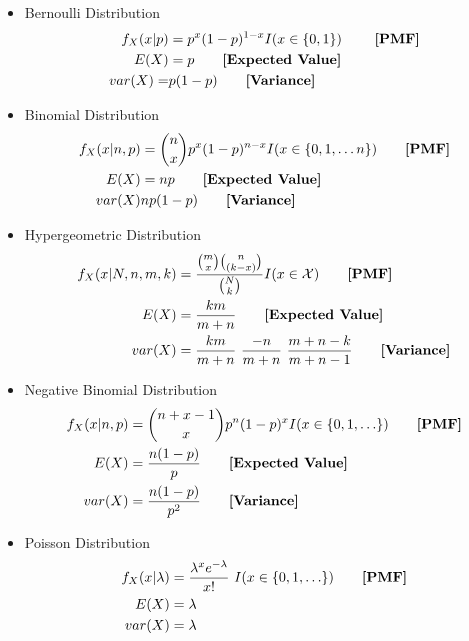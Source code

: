 \documentclass{article}
\begin{document}
  \begin{multicols}{2}
  \begin{itemize}
  \item Bernoulli Distribution
  \begin{align*}
  	f_X(x|p) &= p^x(1-p)^{1-x} I(x \in \{0,1\}) \tag*{ \textbf{[PMF]}}\\
  	E(X) &=p\tag*{\textbf{[Expected Value]}}\\
  	var(X)=&p(1-p)\tag*{\textbf{[Variance]}}\\
  \end{align*}
  \item Binomial Distribution
  \begin{align*}
  	f_X(x|n,p) &={n \choose x} p^x (1-p)^{n-x} I(x \in \{0,1,\ldots n\})\tag*{\textbf{[PMF]}}\\
  	E(X) &= np \tag*{\textbf{[Expected Value]}}\\
	  var(X) & np(1-p)\tag*{\textbf{[Variance]}}\\
  \end{align*}
  \item Hypergeometric Distribution
  \begin{align*}
  	f_X(x|N,n,m,k) &=\frac{{m \choose x}{n \choose (k-x)}}{{N \choose k}}  I(x \in \mathcal{X})\tag*{\textbf{[PMF]}}\\
  	E(X) &= \frac{km}{m+n}\tag*{\textbf{[Expected Value]}}\\
	  var(X) &= \frac{km}{m+n} ~ \frac{-n}{m+n} ~ \frac{m+n-k}{m+n-1} \tag*{\textbf{[Variance]}}\\
  \end{align*}
  \item Negative Binomial Distribution
  \begin{align*}
  	f_X(x|n,p) &={{n+x-1} \choose {x}} p^n (1-p)^{x} I(x \in \{0,1,\ldots\})\tag*{\textbf{[PMF]}}\\
  	E(X) &= \frac{n(1-p)}{p}   \tag*{\textbf{[Expected Value]}}\\
	  var(X) &= \frac{n(1-p)}{p^2} \tag*{\textbf{[Variance]}}\\
  \end{align*}
  \item Poisson Distribution
  \begin{align*}
  	f_X(x|\lambda ) &= \frac{\lambda^x e^{-\lambda}}{x!}~ I(x \in \{0,1,\ldots\}) \tag*{\textbf{[PMF]}}\\
    E(X) &= \lambda\\
    var(X) &= \lambda\\
  \end{align*}

\end{itemize}
\end{multicols}
\end{document}
